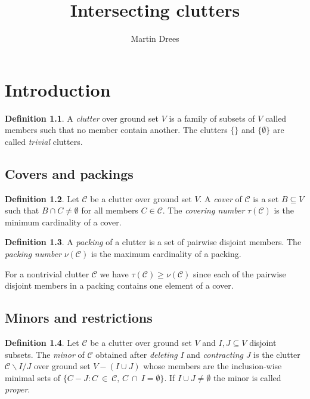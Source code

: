 \documentclass[a4paper, 12pt, twoside=false]{scrbook}
\title{Intersecting clutters}
\author{Martin Drees}
\theoremstyle{definition}
\newtheorem*{definition}{Definition}
\begin{document}
   \maketitle
   \tableofcontents
   \chapter{Introduction}
   \begin{definition}
       A \emph{clutter} over ground set $V$ is a family of subsets of $V$ called members such that no member contain another.
       The clutters $\{\}$ and $\{\emptyset\}$ are called \emph{trivial} clutters.
   \end{definition}

\section{Covers and packings}
\begin{definition}
    Let $\mathcal{C}$ be a clutter over ground set $V$.
    A \emph{cover} of $\mathcal{C}$ is a set $B \subseteq V$ such that $B \cap C \neq \emptyset$ for all members $C \in \mathcal{C}$.
    The \emph{covering number} $\tau(\mathcal{C})$ is the minimum cardinality of a cover.
\end{definition}

\begin{definition}
    A \emph{packing} of a clutter is a set of pairwise disjoint members.
    The \emph{packing number} $\nu(\mathcal{C})$ is the maximum cardinality of a packing.
\end{definition}

For a nontrivial clutter $\mathcal{C}$ we have $\tau(\mathcal{C}) \geq \nu(\mathcal{C})$ since each of the pairwise disjoint members in a packing contains one element of a cover.

\section{Minors and restrictions}
\begin{definition}
    Let $\mathcal{C}$ be a clutter over ground set $V$ and $I, J \subseteq V$ disjoint subsets.
    The \emph{minor} of $\mathcal{C}$ obtained after \emph{deleting} $I$ and \emph{contracting} $J$ is the clutter $\mathcal{C} \backslash I / J$ over ground set $V - (I \cup J)$ whose members are the inclusion-wise minimal sets of $\{C-J : C~\in~\mathcal{C},\, C~\cap~I = \emptyset\}$.
    If $I \cup J \neq \emptyset$ the minor is called \emph{proper}.
\end{definition}
\end{document}
